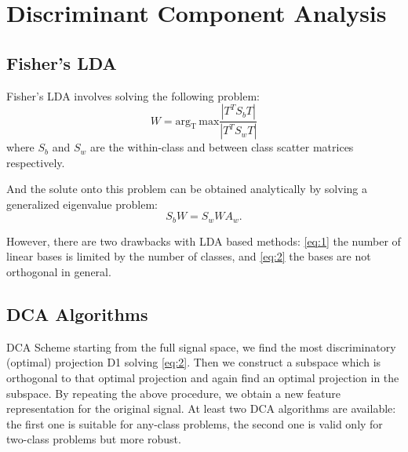 \documentclass[12pt]{article}
\title{}
\author{}
\date{}
\begin{document}
\maketitle

\tableofcontents
\newpage

\section{Discriminant Component Analysis}

\subsection{Fisher's LDA} 
\hspace{10pt}
Fisher's LDA involves solving the following problem: 
\begin{equation}
\label{eq:1}
    W = \operatorname{arg_T\,max} \frac{|T^TS_bT|}{|T^TS_wT|}
\end{equation}
where $S_b$ and $S_w$ are the within-class and between class scatter matrices respectively.

And the solute onto this problem can be obtained analytically by solving a generalized
eigenvalue problem:
\begin{equation}
\label{eq:2}
    S_b W = S_w WA_w.
\end{equation}

However, there are two drawbacks with LDA based methods: \eqref{eq:1} the number of linear
bases is limited by the number of classes, and \eqref{eq:2} the bases are not orthogonal in general.

\subsection{DCA Algorithms}
\hspace{10pt}
DCA Scheme starting from the full signal space, we find the most discriminatory (optimal)
projection D1 solving \eqref{eq:2}. Then we construct a subspace which is orthogonal to that optimal
projection and again find an optimal projection in the subspace. By repeating the above procedure, we obtain a new feature representation for the original signal. At least two DCA algorithms are available: the first one is suitable for any-class problems, the second one is valid only for two-class problems but more robust.
\end{document}
